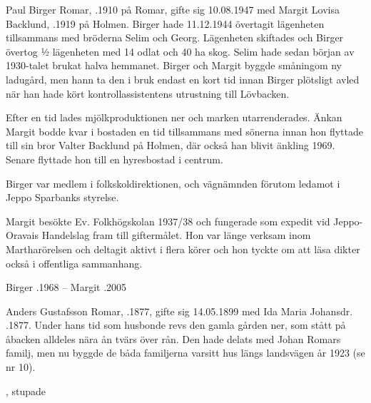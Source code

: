 Paul Birger Romar, .1910 på Romar, gifte sig 10.08.1947 med Margit Lovisa Backlund, .1919 på Holmen. Birger hade 11.12.1944 övertagit lägenheten tillsammans med bröderna Selim och Georg. Lägenheten skiftades och Birger övertog ½ lägenheten med 14 odlat och 40 ha skog. Selim hade sedan början av 1930-talet brukat halva hemmanet. Birger och Margit byggde småningom ny ladugård, men hann ta den i bruk endast en kort tid innan Birger plötsligt avled när han hade kört kontrollassistentens utrustning till Lövbacken.

Efter en tid lades mjölkproduktionen ner och marken utarrenderades. Änkan Margit bodde kvar i bostaden en tid tillsammans med sönerna innan hon flyttade till sin bror Valter Backlund på Holmen, där också han blivit änkling 1969. Senare flyttade hon till en hyresbostad i centrum.

Birger var medlem i folkskoldirektionen, och vägnämnden förutom ledamot i Jeppo Sparbanks styrelse.

Margit besökte Ev. Folkhögskolan 1937/38 och fungerade som expedit vid Jeppo-Oravais Handelslag fram till giftermålet. Hon var länge verksam inom Martharörelsen och deltagit aktivt i flera körer och hon tyckte om att läsa dikter också i offentliga sammanhang.
\begin{jhchildren}
  \item {}
  \item {}
\end{jhchildren}

Birger .1968  --  Margit .2005


Anders Gustafsson Romar, .1877, gifte sig 14.05.1899 med Ida Maria Johansdr. .1877. Under hans tid som husbonde revs den gamla gården ner, som stått på åbacken alldeles nära ån tvärs över rån. Den hade delats med Johan Romars familj, men nu byggde de båda familjerna varsitt hus längs landsvägen år 1923 (se nr 10).
\begin{jhchildren}
  \item {}
  \item {}
  \item {}
  \item {}, stupade
  \item {}
  \item {}
\end{jhchildren}

